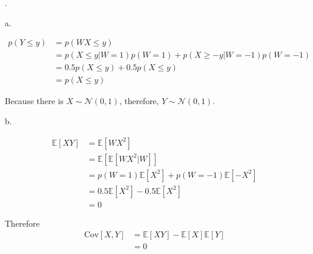 \documentclass[UTF8]{article}
\begin{document}
.

\noindent a.

\begin{align*}
	p(Y\le y) &= p(WX\le y)\\
	&= p(X\le y| W=1)p(W=1) + p(X\ge -y | W=-1)p(W=-1)\\
	&= 0.5p(X\le y) + 0.5p(X\le y)\\
	&= p(X\le y)
\end{align*}

Because there is $X\sim\mathcal{N}(0,1)$, therefore, $Y\sim\mathcal{N}(0,1)$.

\noindent b.

\begin{align*}
	\mathbb{E}[XY] &= \mathbb{E}[WX^2]\\
	&= \mathbb{E}[\mathbb{E}[WX^2|W]]\\
	&= p(W=1)\mathbb{E}[X^2] + p(W=-1)\mathbb{E}[-X^2]\\ 
	&= 0.5\mathbb{E}[X^2] - 0.5\mathbb{E}[X^2]\\
	&= 0
\end{align*}

Therefore
\begin{align*}
	\text{Cov}[X,Y] &= \mathbb{E}[XY] - \mathbb{E}[X]\mathbb{E}[Y]\\
	&=0
\end{align*}
\end{document}

